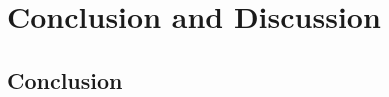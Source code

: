 \documentclass{article}
\begin{document}

\section{Conclusion and Discussion}
\label{sec:conclusion_discussion}

\subsection{Conclusion}
\label{sec:conclusion}
\end{document}
